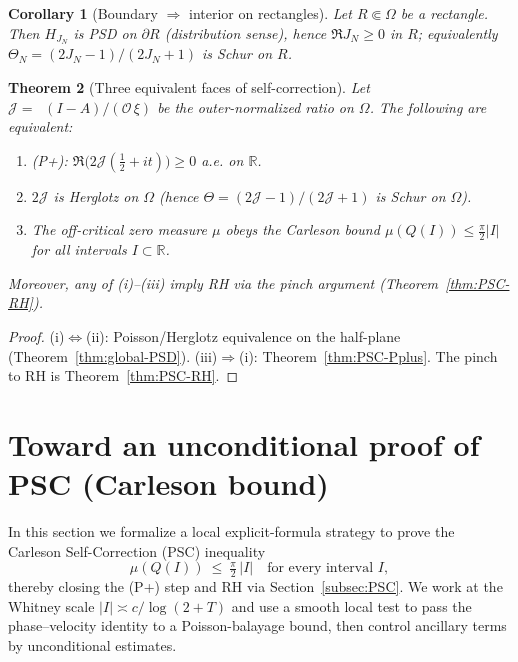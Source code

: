 \documentclass[11pt]{article}
\newtheorem{theorem}{Theorem}
\newtheorem{corollary}[theorem]{Corollary}
\theoremstyle{definition}
\theoremstyle{remark}
\newcommand{\R}{\mathbb{R}}
\DeclareMathOperator{\dettwo}{det_2}
\begin{document}
\begin{corollary}[Boundary $\Rightarrow$ interior on rectangles]\label{cor:bdry-to-int}
Let $R\Subset\Omega$ be a rectangle. Then $H_{J_N}$ is PSD on $\partial R$ (distribution sense), hence $\Re J_N\ge 0$ in $R$; equivalently $\Theta_N=(2J_N-1)/(2J_N+1)$ is Schur on $R$.
\end{corollary}

\begin{theorem}[Three equivalent faces of self-correction]\label{thm:SC-equivalences}
Let $\mathcal J=\dettwo(I-A)/(\mathcal O\,\xi)$ be the outer-normalized ratio on $\Omega$. The following are equivalent:
\begin{enumerate}
\item[\textup{(i)}] \textup{(P+)}: $\Re\bigl(2\mathcal J(\tfrac12+it)\bigr)\ge 0$ a.e. on $\R$.
\item[\textup{(ii)}] $2\mathcal J$ is Herglotz on $\Omega$ (hence $\Theta=(2\mathcal J-1)/(2\mathcal J+1)$ is Schur on $\Omega$).
\item[\textup{(iii)}] The off-critical zero measure $\mu$ obeys the Carleson bound $\mu(Q(I))\le \tfrac{\pi}{2}|I|$ for all intervals $I\subset\R$.
\end{enumerate}
Moreover, any of (i)–(iii) imply RH via the pinch argument (Theorem~\ref{thm:PSC-RH}).
\end{theorem}
\begin{proof}
(i)$\Leftrightarrow$(ii): Poisson/Herglotz equivalence on the half-plane (Theorem~\ref{thm:global-PSD}). (iii)$\Rightarrow$(i): Theorem~\ref{thm:PSC-Pplus}. The pinch to RH is Theorem~\ref{thm:PSC-RH}.
\end{proof}


\section{Toward an unconditional proof of PSC (Carleson bound)}\label{sec:unconditional-psc-proof}
In this section we formalize a local explicit-formula strategy to prove the Carleson Self-Correction (PSC) inequality
\[ \mu(Q(I))\ \le\ \tfrac{\pi}{2}\,|I| \quad\text{for every interval } I, \]
thereby closing the (P+) step and RH via Section~\ref{subsec:PSC}. We work at the Whitney scale \(|I|\asymp c/\log(2+T)\) and use a smooth local test to pass the phase--velocity identity to a Poisson-balayage bound, then control ancillary terms by unconditional estimates.
\end{document}
